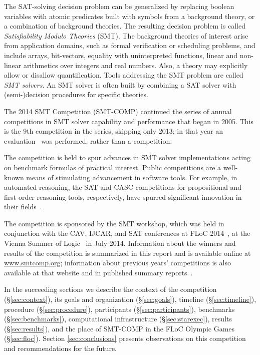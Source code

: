\documentclass[twoside,11pt]{article}
\begin{document}
The SAT-solving decision problem can be generalized by replacing
boolean variables with atomic predicates built with symbols from a
background theory, or a combination of background theories. The
resulting decision problem is called \emph{Satisfiability Modulo
  Theories\/} (SMT). The background theories of interest arise from 
	application domains, such as formal verification or scheduling problems, and include arrays,
bit-vectors, equality with uninterpreted functions, linear and
non-linear arithmetics over integers and real numbers. Also, a theory
may explicitly allow or disallow quantification. Tools addressing the
SMT problem are called \emph{SMT solvers\/}. An SMT solver is often
built by combining a SAT solver with (semi-)decision procedures for
specific theories.

The 2014 SMT Competition (SMT-COMP) continued the series of annual competitions in SMT solver capability and performance that began in 2005. This is the 9th competition in the series, skipping only 2013; in that year an evaluation~\cite{it:2014-017} was performed, rather than a competition.

The competition is held to spur advances in
SMT solver implementations acting on benchmark formulas of practical interest. Public competitions are
a well-known means of stimulating advancement in software tools. For example, in automated
reasoning, the SAT and CASC competitions for propositional and first-order reasoning tools, respectively,
have spurred significant innovation in their fields~\cite{leberre+03,PSS02}.

The competition is sponsored by the SMT workshop, which was held in conjunction with the
CAV, IJCAR, and SAT conferences at FLoC 2014~\cite{FLoC2014}, at the Vienna Summer of Logic~\cite{VSL} in July 2014.
Information about the winners
and results of the competition is summarized in this report and is available online at \url{www.smtcomp.org}; information
about previous years' competitions is also available at that website and in published summary reports~\cite{springerlink:10.1007/s10817-012-9246-5,DBLP:conf/cade/CokGBD12,it:2014-017}.

In the succeeding sections we describe the context of the competition (\S\ref{sec:context}), its goals and organization (\S\ref{sec:goals}), timeline (\S\ref{sec:timeline}), procedure (\S\ref{sec:procedure}), participants (\S\ref{sec:participants}), benchmarks (\S\ref{sec:benchmarks}), computational infrastructure (\S\ref{sec:starexec}), results (\S\ref{sec:results}), and the place of SMT-COMP in the FLoC Olympic Games (\S\ref{sec:floc}). Section \ref{sec:conclusions} presents observations on this competition and recommendations for the future.
\end{document}
